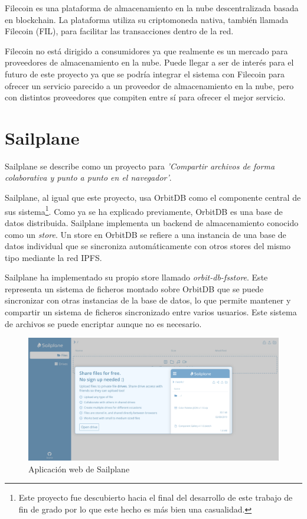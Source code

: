 Filecoin\cite{filecoinDecentralizedStorageNetwork} es una plataforma de almacenamiento en la nube descentralizada basada en
blockchain. La plataforma utiliza su criptomoneda nativa, también llamada Filecoin (FIL), para facilitar las transacciones dentro
de la red.

Filecoin no está dirigido a consumidores ya que realmente es un mercado para proveedores de almacenamiento en la nube. Puede llegar
a ser de interés para el futuro de este proyecto ya que se podría integrar el sistema con Filecoin para ofrecer un servicio parecido
a un proveedor de almacenamiento en la nube, pero con distintos proveedores que compiten entre sí para ofrecer el mejor servicio.

\section{Sailplane}

Sailplane se describe como un proyecto para \textit{'Compartir archivos de forma colaborativa y punto a punto en el navegador'}.

Sailplane, al igual que este proyecto, usa OrbitDB como el componente central de sus sistema\footnote{Este proyecto fue descubierto
    hacia el final del desarrollo de este trabajo de fin de grado por lo que este hecho es más bien una casualidad.}.
Como ya se ha explicado previamente, OrbitDB es una base de datos distribuida. Sailplane implementa un backend de almacenamiento
conocido como un \textit{store}. Un store en OrbitDB se refiere a una instancia de una base de datos individual que se sincroniza
automáticamente con otros stores del mismo tipo mediante la red IPFS.

Sailplane ha implementado su propio store llamado \textit{orbit-db-fsstore}\cite{TabcatOrbitdbfsstoreCustom}. Este representa
un sistema de ficheros montado sobre OrbitDB que se puede sincronizar con otras instancias de la base de datos, lo que permite
mantener y compartir un sistema de ficheros sincronizado entre varios usuarios. Este sistema de archivos se puede encriptar aunque no es necesario.

\begin{figure}[H]
    \centering
    \small
    \includegraphics[width=\linewidth]{images/sailplane.png}
    \caption{Aplicación web de Sailplane}
    \label{fig:sailplaneweb}
\end{figure}

